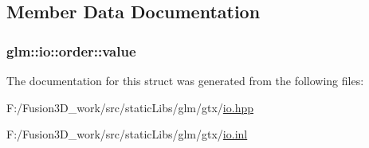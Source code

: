 \subsection{Member Data Documentation}
\hypertarget{structglm_1_1io_1_1order_aa8788dd0568bacd081d02bd5aca9889b}{}
\subsubsection[{value}]{ glm\+::io\+::order\+::value}\label{structglm_1_1io_1_1order_aa8788dd0568bacd081d02bd5aca9889b}


The documentation for this struct was generated from the following files\+:\begin{DoxyCompactItemize}
\item 
F\+:/\+Fusion3\+D\+\_\+work/src/static\+Libs/glm/gtx/\hyperlink{io_8hpp}{io.\+hpp}\item 
F\+:/\+Fusion3\+D\+\_\+work/src/static\+Libs/glm/gtx/\hyperlink{io_8inl}{io.\+inl}\end{DoxyCompactItemize}
